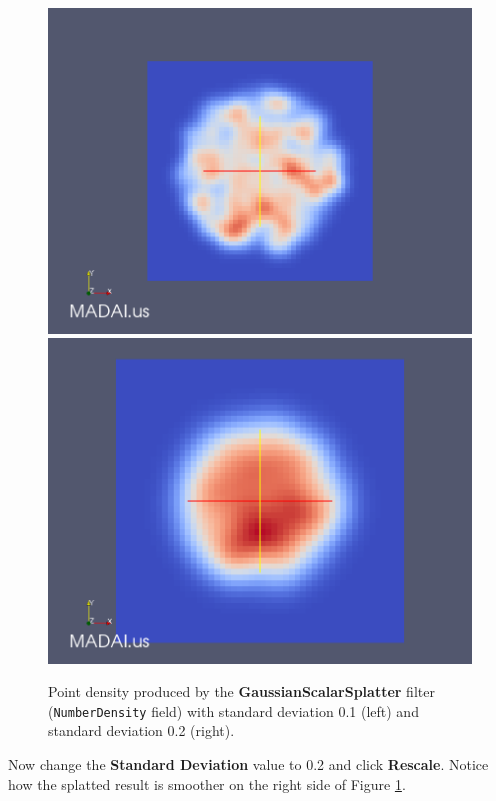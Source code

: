 \documentclass[12pt]{article}
\newcommand{\filter}[1]{\textbf{#1}}
\newcommand{\setting}[1]{\textbf{#1}}
\newcommand{\field}[1]{\texttt{#1}}
\begin{document}
\begin{figure}[htbp]
   \centering
   \includegraphics[scale=.22]{images/GaussianScalarSplatterPoint1.png}
   \includegraphics[scale=.22]{images/GaussianScalarSplatterPoint2.png}
   \caption{Point density produced by the \filter{GaussianScalarSplatter} filter (\field{NumberDensity} field) with standard deviation 0.1 (left) and standard deviation 0.2 (right).}
   \label{fig:GaussianScalarSplatter1}
\end{figure}

Now change the \setting{Standard Deviation} value to 0.2 and click \setting{Rescale}. Notice how the splatted result is smoother on the right side of Figure \ref{fig:GaussianScalarSplatter1}.
\end{document}

